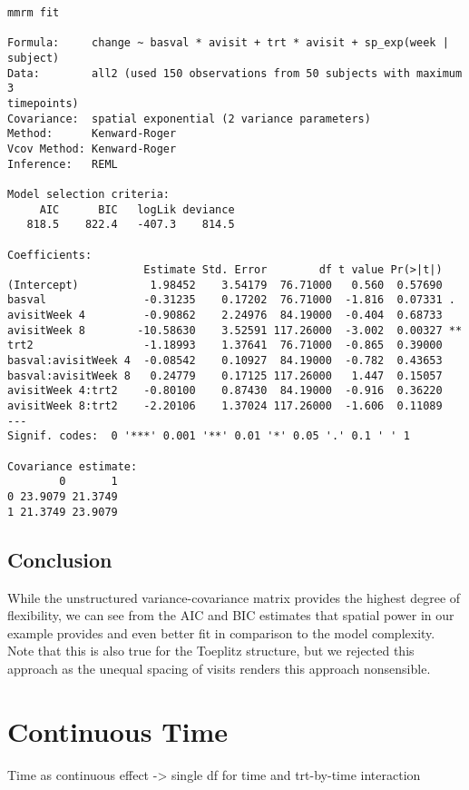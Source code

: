 \documentclass[
  letterpaper,
  DIV=11,
  numbers=noendperiod]{scrreprt}
\begin{document}
\begin{verbatim}
mmrm fit

Formula:     change ~ basval * avisit + trt * avisit + sp_exp(week | subject)
Data:        all2 (used 150 observations from 50 subjects with maximum 3 
timepoints)
Covariance:  spatial exponential (2 variance parameters)
Method:      Kenward-Roger
Vcov Method: Kenward-Roger
Inference:   REML

Model selection criteria:
     AIC      BIC   logLik deviance 
   818.5    822.4   -407.3    814.5 

Coefficients: 
                     Estimate Std. Error        df t value Pr(>|t|)   
(Intercept)           1.98452    3.54179  76.71000   0.560  0.57690   
basval               -0.31235    0.17202  76.71000  -1.816  0.07331 . 
avisitWeek 4         -0.90862    2.24976  84.19000  -0.404  0.68733   
avisitWeek 8        -10.58630    3.52591 117.26000  -3.002  0.00327 **
trt2                 -1.18993    1.37641  76.71000  -0.865  0.39000   
basval:avisitWeek 4  -0.08542    0.10927  84.19000  -0.782  0.43653   
basval:avisitWeek 8   0.24779    0.17125 117.26000   1.447  0.15057   
avisitWeek 4:trt2    -0.80100    0.87430  84.19000  -0.916  0.36220   
avisitWeek 8:trt2    -2.20106    1.37024 117.26000  -1.606  0.11089   
---
Signif. codes:  0 '***' 0.001 '**' 0.01 '*' 0.05 '.' 0.1 ' ' 1

Covariance estimate:
        0       1
0 23.9079 21.3749
1 21.3749 23.9079
\end{verbatim}

\hypertarget{conclusion}{%
\subsection{Conclusion}\label{conclusion}}

While the unstructured variance-covariance matrix provides the highest
degree of flexibility, we can see from the AIC and BIC estimates that
spatial power in our example provides and even better fit in comparison
to the model complexity. Note that this is also true for the Toeplitz
structure, but we rejected this approach as the unequal spacing of
visits renders this approach nonsensible.

\hypertarget{continuous-time}{%
\section{Continuous Time}\label{continuous-time}}

Time as continuous effect -\textgreater{} single df for time and
trt-by-time interaction
\end{document}
